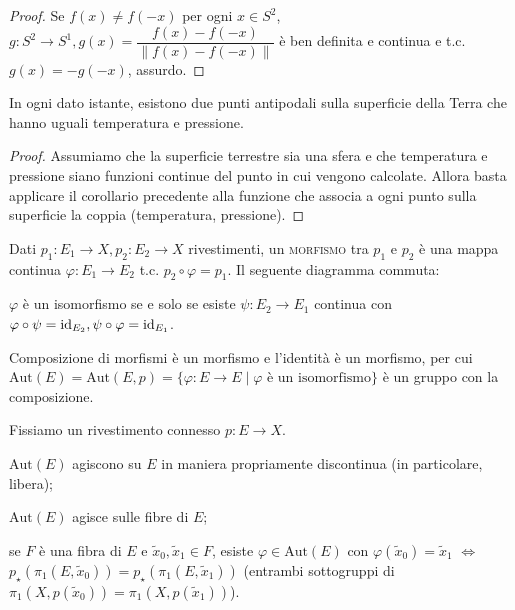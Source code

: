 \begin{proof}
  Se $f(x) \not=f(-x)$ per ogni $x \in S^2$, $g:S^2 \longrightarrow S^1, g(x)=\dfrac{f(x)-f(-x)}{\|f(x)-f(-x)\|}$ è ben definita e continua e t.c. $g(x)=-g(-x)$, assurdo.
\end{proof}

\begin{cor}
  In ogni dato istante, esistono due punti antipodali sulla superficie della Terra che hanno uguali temperatura e pressione.
\end{cor}

\begin{proof}
  Assumiamo che la superficie terrestre sia una sfera e che temperatura e pressione siano funzioni continue del punto in cui vengono calcolate. Allora basta applicare il corollario precedente alla funzione che associa a ogni punto sulla superficie la coppia (temperatura, pressione).
\end{proof}

\begin{defn}
  Dati $p_1:E_1 \longrightarrow X, p_2:E_2 \longrightarrow X$ rivestimenti, un \textsc{morfismo} tra $p_1$ e $p_2$ è una mappa continua $\varphi:E_1 \longrightarrow E_2$ t.c. $p_2 \circ \varphi=p_1$. Il seguente diagramma commuta:
  \begin{center}
  \end{center}
  $\varphi$ è un isomorfismo se e solo se esiste $\psi:E_2 \longrightarrow E_1$ continua con $\varphi \circ \psi=\operatorname{id}_{E_2}, \psi \circ \varphi=\operatorname{id}_{E_1}$.
\end{defn}

Composizione di morfismi è un morfismo e l'identità è un morfismo, per cui $\text{Aut}(E)=\text{Aut}(E, p)=\{\varphi:E \longrightarrow E \mid \varphi \text{ è un isomorfismo}\}$ è un gruppo con la composizione.

Fissiamo un rivestimento connesso $p:E \longrightarrow X$.

\begin{thm}
  \begin{nlist}
    \item $\text{Aut}(E)$ agiscono su $E$ in maniera propriamente discontinua (in particolare, libera);
    \item $\text{Aut}(E)$ agisce sulle fibre di $E$;
    \item se $F$ è una fibra di $E$ e $\tilde{x}_0, \tilde{x}_1 \in F$, esiste $\varphi \in \text{Aut}(E)$ con $\varphi(\tilde{x}_0)=\tilde{x}_1$ $\iff$ $p_{\star}(\pi_1(E, \tilde{x}_0))=p_{\star}(\pi_1(E, \tilde{x}_1))$
    (entrambi sottogruppi di $\pi_1(X, p(\tilde{x}_0))=\pi_1(X, p(\tilde{x}_1))$).
  \end{nlist}
\end{thm}

